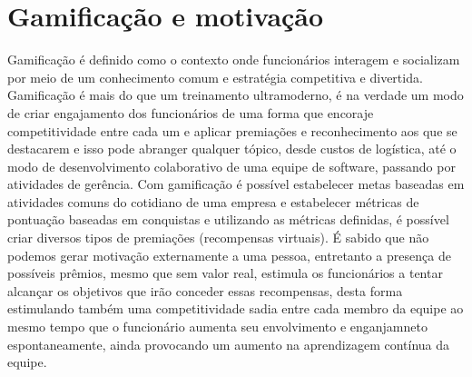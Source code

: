 \section{Gamificação e motivação}
Gamificação é definido como o contexto onde funcionários interagem e socializam por meio de um conhecimento comum e estratégia competitiva e divertida. Gamificação é mais do que um treinamento ultramoderno, é na verdade um modo de criar engajamento dos funcionários de uma forma que encoraje competitividade entre cada um e aplicar premiações e reconhecimento aos que se destacarem e isso pode abranger qualquer tópico, desde custos de logística, até o modo de desenvolvimento colaborativo de uma equipe de software, passando por atividades de gerência.
	Com gamificação é possível estabelecer metas baseadas em atividades comuns do cotidiano de uma empresa e estabelecer métricas de pontuação baseadas em conquistas e  utilizando as métricas definidas, é possível criar diversos tipos de premiações (recompensas virtuais). 
	É sabido que não podemos gerar motivação externamente a uma pessoa, entretanto a presença de possíveis prêmios, mesmo que sem valor real, estimula os funcionários a tentar alcançar os objetivos que irão conceder essas recompensas, desta forma estimulando também uma competitividade sadia entre cada membro da equipe ao mesmo tempo que o funcionário aumenta seu envolvimento e enganjamneto espontaneamente, ainda provocando um aumento na aprendizagem contínua da equipe. 